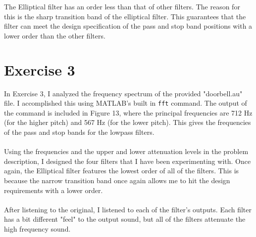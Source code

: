 \documentclass{article}
\begin{document}
\begin{par}
The Elliptical filter has an order less than that of other filters.  The reason for this is the sharp transition band of the elliptical filter.  This guarantees that the filter can meet the design specification of the pass and stop band positions with a lower order than the other filters.
\end{par}

\section*{Exercise 3}
\begin{par}
In Exercise 3, I analyzed the frequency spectrum of the provided "doorbell.au" file.  I accomplished this using MATLAB's built in \texttt{fft} command.  The output of the command is included in Figure 13, where the principal frequencies are 712 Hz (for the higher pitch) and 567 Hz (for the lower pitch).  This gives the frequencies of the pass and stop bands for the lowpass filters. \\
\\
Using the frequencies and the upper and lower attenuation levels in the problem description, I designed the four filters that I have been experimenting with.  Once again, the Elliptical filter features the lowest order of all of the filters.  This is because the narrow transition band once again allows me to hit the design requirements with a lower order.\\
\\
After listening to the original, I listened to each of the filter's outputs.  Each filter has a bit different "feel" to the output sound, but all of the filters attenuate the high frequency sound.
\end{par}

\end{document}
